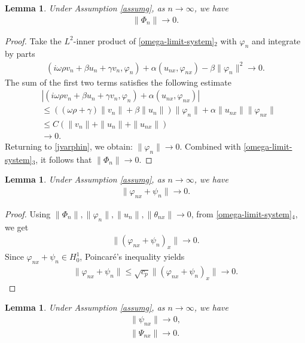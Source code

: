 \documentclass[11pt,reqno]{article}
\newtheorem{lemma}[theorem]{Lemma}
\begin{document}
\begin{lemma}\label{iR:Phin}
	Under Assumption \ref{assumg}, as $n \to \infty$, we have
	\begin{align}
		\|\Phi_n\| \to 0.\label{limit:Phin}
	\end{align}
\end{lemma}
\begin{proof}
	Take the $L^2$-inner product of \eqref{omega-limit-system}$_2$ with $\varphi_n$ and integrate by parts
	\begin{align}\label{jvarphin}
		(i \omega \rho v_n + \beta u_n + \gamma v_n, \varphi_n) + \alpha(u_{nx}, \varphi_{nx}) - \beta \|\varphi_n\|^2 \to 0.
	\end{align}
	The sum of the first two terms satisfies the following estimate
	\begin{align*}
		&|(i \omega \rho v_n + \beta u_n + \gamma v_n, \varphi_n) + \alpha(u_{nx}, \varphi_{nx})| \\
		&\leq (( \omega \rho + \gamma) \|v_n\| + \beta \|u_n\|) \|\varphi_n\| + \alpha \|u_{nx}\| \|\varphi_{nx}\| \\
		&\leq C(\|v_n\| + \|u_n\| + \|u_{nx}\|) \\
		&\to 0.
	\end{align*}
	Returning to \eqref{jvarphin}, we obtain: $\|\varphi_n\| \to 0$.
	Combined with \eqref{omega-limit-system}$_3$, it follows that $\|\Phi_n\| \to 0$.
\end{proof}
\begin{lemma}\label{iR:varphin}
	Under Assumption \ref{assumg}, as $n \to \infty$, we have
	\begin{align}
		\|\varphi_{nx} + \psi_n\| \to 0.\label{limit:varphin}
	\end{align}
\end{lemma}
\begin{proof}
	Using $\|\Phi_n\|, \|\varphi_n\|, \|u_n\|, \|\theta_{nx}\| \to 0$, from \eqref{omega-limit-system}$_4$, we get
	\begin{align*}
		\|(\varphi_{nx} + \psi_n)_x\| \to 0.
	\end{align*}
	Since $\varphi_{nx} + \psi_n \in H_0^1$, Poincar\'e's inequality yields
	\begin{align*}
		\|\varphi_{nx} + \psi_n\| \leq \sqrt{c_p}\|(\varphi_{nx} + \psi_n)_x\| \to 0.
	\end{align*}
\end{proof}
\begin{lemma}\label{iR:psin,Psin}
	Under Assumption \ref{assumg}, as $n \to \infty$, we have
	\begin{align}
		\|\psi_{nx}\| \to 0,\label{limit:psin}\\
		\|\Psi_{nx}\| \to 0.\label{limit:Psin}
	\end{align}
\end{lemma}
\end{document}
